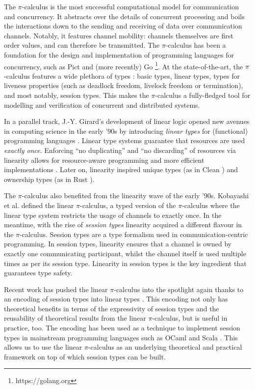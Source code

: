 \documentclass[a4paper,UKenglish,cleveref,autoref,thm-restate,authorcolumns]{lipics-v2019}
\theoremstyle{definition}
\newcommand{\picalc}{$\pi$-calculus}
\begin{document}
The \picalc{} \cite{MilnerPW92,Milner99} is the most successful computational model for communication and concurrency.
It abstracts over the details of concurrent processing and boils the interactions down to the sending and receiving of data over communication channels.
Notably, it features channel mobility: channels themselves are first order values, and can therefore be transmitted.
The \picalc{} has been a foundation for the design and implementation of programming languages for concurrency, such as Pict \cite{PierceT00} and (more recently) Go \footnote{https://golang.org}.
At the state-of-the-art, the \picalc{} features a wide plethora of types \cite{K07}: basic types, linear types, types for liveness properties (such as deadlock freedom, livelock freedom or termination), and most notably, session types. This makes the \picalc{} a fully-fledged tool for modelling and verification of concurrent and distributed systems.

In a parallel track, J.-Y. Girard's development of linear logic \cite{Girard87} opened new avenues in computing science in the early '90s by introducing \emph{linear types} for (functional) programming languages \cite{Wadler90,Bernardy2018}.
Linear type systems guarantee that resources are used \emph{exactly once}.
Enforcing ``no duplicating'' and ``no discarding'' of resources via linearity allows for resource-aware programming and more efficient implementations \cite{Wadler90}.
Later on, linearity inspired unique types (as in Clean \cite{BarendsenS96}) and ownership types (as in Rust \cite{MatsakisK14}).

The \picalc{} also benefited from the linearity wave of the early '90s.
Kobayashi et al. \cite{KPT96} defined the {linear} \picalc{}, a typed version of the \picalc{} where the linear type system restricts the usage of channels to exactly once.
%
In the meantime, with the rise of \emph{session types} \cite{H93,THK94,HVK98} linearity acquired a different flavour in the \picalc{}.
Session types are a type formalism used in communication-centric programming.
In session types, linearity ensures that a channel is owned by exactly one communicating participant, whilst the channel itself is used multiple times as per its session type.
Linearity in session types is the key ingredient that guarantees type safety.

Recent work has pushed the linear \picalc{} into the spotlight again \cite{KPT96} thanks to an encoding of session types into linear types \cite{DardhaGS12,Dardha14,DardhaGS17}.
This encoding not only has theoretical benefits in terms of the expressivity of session types and the reusability of theoretical results from the linear \picalc{}, but is useful in practice, too.
The encoding has been used as a technique to implement session types in mainstream programming languages such as OCaml \cite{Padovani17} and Scala \cite{ScalasY16,ScalasDHY17}.
This allows us to use the linear \picalc{} as an underlying theoretical and practical framework on top of which session types can be built.
\end{document}
